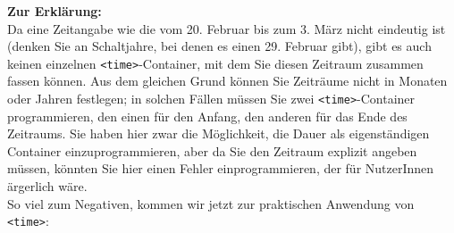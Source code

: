 \textbf{Zur Erklärung:}\\

Da eine Zeitangabe wie die vom 20. Februar bis zum 3. März nicht eindeutig ist (denken Sie an Schaltjahre, bei denen es einen 29. Februar gibt), gibt es auch keinen einzelnen \verb|<time>|-Container, mit dem Sie diesen Zeitraum zusammen fassen können. Aus dem gleichen Grund können Sie Zeiträume nicht in Monaten oder Jahren festlegen; in solchen Fällen müssen Sie zwei \verb|<time>|-Container programmieren, den einen für den Anfang, den anderen für das Ende des Zeitraums. Sie haben hier zwar die Möglichkeit, die Dauer als eigenständigen Container einzuprogrammieren, aber da Sie den Zeitraum explizit angeben müssen, könnten Sie hier einen Fehler einprogrammieren, der für NutzerInnen ärgerlich wäre.\\

So viel zum Negativen, kommen wir jetzt zur praktischen Anwendung von \verb|<time>|:

